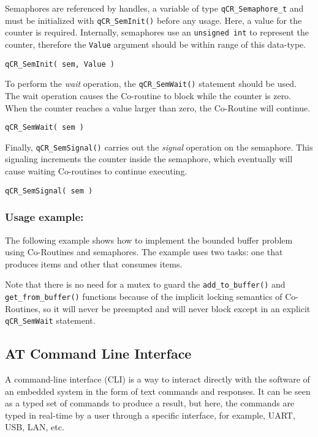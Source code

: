 Semaphores are referenced by handles, a variable of type \lstinline{qCR_Semaphore_t} and must be initialized with \lstinline{qCR_SemInit()}  before any usage.  Here, a value for the counter is required. Internally, semaphores use an \lstinline{unsigned int} to represent the counter, therefore the \lstinline{Value} argument should be within range of this data-type.
\medskip

\begin{lstlisting}[style=CStyle]
qCR_SemInit( sem, Value )
\end{lstlisting}

To perform the \textit{wait} operation, the \lstinline{qCR_SemWait()}  statement should be used. The wait operation causes the Co-routine to block while the counter is zero. When the counter reaches a value larger than zero, the Co-Routine will continue.
\medskip


\begin{lstlisting}[style=CStyle]
qCR_SemWait( sem )
\end{lstlisting}

Finally, \lstinline{qCR_SemSignal()}  carries out the \textit{signal} operation on the semaphore. This signaling increments the counter inside the semaphore, which eventually will cause waiting Co-routines to continue executing.
\medskip

\begin{lstlisting}[style=CStyle]
qCR_SemSignal( sem )
\end{lstlisting}


\subsubsection*{Usage example:}
The following example shows how to implement the bounded buffer problem using Co-Routines and semaphores. The example uses two tasks: one that produces items and other that consumes items.

Note that there is no need for a mutex to guard the \lstinline{add_to_buffer()} and \lstinline{get_from_buffer()} functions because of the implicit locking semantics of Co-Routines, so it will never be preempted and will never block except in an explicit \lstinline{qCR_SemWait} statement.
\medskip



\subsection{AT Command Line Interface} 
A command-line interface (CLI) is a way to interact directly with the software of an embedded system in the form of text commands and responses. It can be seen as a typed set of commands to produce a result, but here, the commands are typed in real-time by a user through a specific interface, for example, UART, USB, LAN, etc. 

